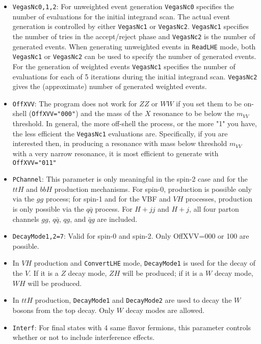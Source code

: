 \documentclass[aps,superscriptaddress,nofootinbib]{revtex4}
\begin{document}
\begin{itemize}
\item {\verb|VegasNc0,1,2|}: For unweighted event generation \verb|VegasNc0| specifies the number of evaluations for the initial integrand scan.  The actual event generation is controlled by either \verb|VegasNc1| or \verb|VegasNc2|. \verb|VegasNc1| specifies the number of tries in the accept/reject phase and \verb|VegasNc2| is the number of generated events. When generating unweighted events in \verb|ReadLHE| mode, both \verb|VegasNc1| or \verb|VegasNc2| can be used to specify the number of generated events. For the generation of weighted events \verb|VegasNc1| specifies the number of evaluations for each of 5 iterations during the initial integrand scan. \verb|VegasNc2| gives the (approximate) number of generated weighted events.
\item {\verb|OffXVV|}: The program does not work for $ZZ$ or $WW$ if you set them to be on-shell (\verb|OffXVV="000"|) and the mass of the $X$ resonance to be below the $m_{VV}$ threshold.  In general, the more off-shell the process, or the more "1" you have, the less efficient the \verb|VegasNc1| evaluations are.  Specifically, if you are interested then, in producing a resonance with mass below threshold $m_{VV}$ with a very narrow resonance, it is most efficient to generate with \verb|OffXVV="011"|
\item \verb|PChannel|: This parameter is only meaningful in the spin-2 case and for the $ttH$ and $bbH$ production mechanisms.  For spin-0, production is possible only via the $gg$ process; for spin-1 and for the VBF and $VH$ processes, production is only possible via the $q\bar{q}$ process.  For $H+jj$ and $H+j$, all four parton channels $gg$, $q\bar{q}$, $qg$, and $\bar{q}g$ are included.
\item \verb|DecayMode1,2=7|: Valid for spin-0 and spin-2.  Only OffXVV=000 or 100 are possible.
\item In $VH$ production and \verb|ConvertLHE| mode, \verb|DecayMode1| is used for the decay of the $V$.  If it is a $Z$ decay mode, $ZH$ will be produced; if it is a $W$ decay mode, $WH$ will be produced.
\item In $ttH$ production, \verb|DecayMode1| and \verb|DecayMode2| are used to decay the $W$ bosons from the top decay.  Only $W$ decay modes are allowed.
\item \verb|Interf|: For final states with 4 same flavor fermions, this parameter controls whether or not to include interference effects.
\end{itemize}
\end{document}
